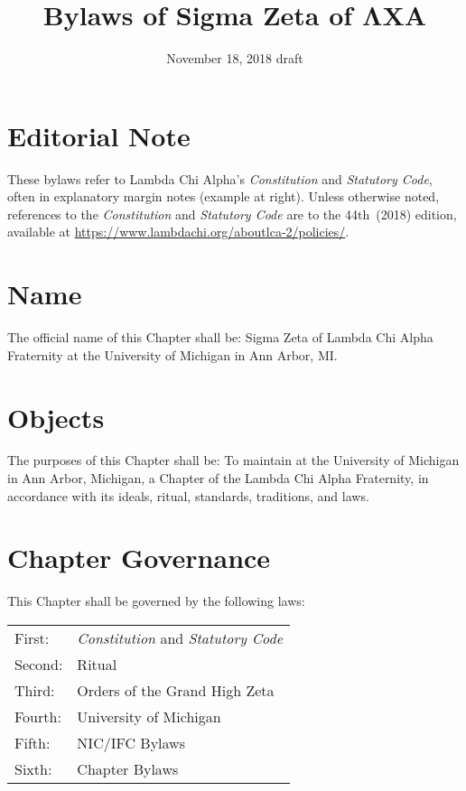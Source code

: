 \documentclass{article}
\title{Bylaws of Sigma Zeta of ΛΧΑ}
\date{November 18, 2018 draft}
\begin{document}
\maketitle

\section*{Editorial Note}

These bylaws refer to Lambda Chi Alpha’s \emph{Constitution} and \emph{Statutory
Code}, often in explanatory margin notes  (example at right). Unless otherwise noted, references to the
\emph{Constitution} and \emph{Statutory Code} are to the 44th~(2018) edition,
available at \url{https://www.lambdachi.org/aboutlca-2/policies/}.

\section{Name}

The official name of this Chapter shall be: Sigma Zeta  of Lambda Chi Alpha Fraternity at the University
of Michigan in Ann Arbor, MI.

\section{Objects}

The purposes of this Chapter shall be: To maintain at the University of Michigan
in Ann Arbor, Michigan, a Chapter of the Lambda Chi Alpha Fraternity, in
accordance with its ideals, ritual, standards, traditions, and laws.

\section{Chapter Governance}

This Chapter shall be governed by the following laws:

\hspace*{-\tabcolsep}%
\begin{tabular}{ll}
  First:  & \emph{Constitution} and \emph{Statutory Code} \\
  Second: & Ritual                                        \\
  Third:  & Orders of the Grand High Zeta                 \\
  Fourth: & University of Michigan                        \\
  Fifth:  & NIC/IFC Bylaws                                \\
  Sixth:  & Chapter Bylaws                                \\
\end{tabular}
\end{document}
